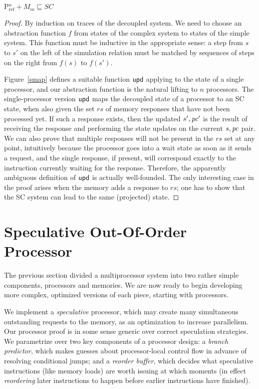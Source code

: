 \begin{theorem}
$\text{P$^n_{\text{ref}}$} + M_m \sqsubseteq SC$\label{scthm}
\end{theorem}
\begin{proof}
\vspace{-.1cm}
By induction on traces of the decoupled system.  We need to choose an
abstraction function $f$ from states of the complex system to states of
the simple system.  This function must be inductive in the
appropriate sense: a step from $s$ to $s'$ on the left of the
simulation relation must be matched by sequences of steps on the right
from $f(s)$ to $f(s')$.

Figure~\ref{smap} defines a suitable function $\mathsf{upd}$ applying to the
state of a single processor, and our abstraction function is the
natural lifting to $n$ processors.
The single-processor version $\mathsf{upd}$ maps
the decoupled state of a processor to an SC state, when also given the
set $rs$ of memory responses that have not been processed yet. If such a
response exists, then the updated $s', \mathit{pc}'$ is the result of
receiving the response and performing the state updates on the current $s,
\mathit{pc}$ pair.  We can also prove that multiple responses will not be present in
the $rs$ set at any point, intuitively because the processor goes into a wait
state as soon as it sends a request, and the single response, if present, will
correspond exactly to the instruction currently waiting for the response.
Therefore, the apparently ambiguous definition of $\mathsf{upd}$ is actually
well-founded.  The only interesting case in the proof arises when the memory adds a
response to $rs$; one has to show that the SC system can lead to the same
(projected) state.
\end{proof}

\section{Speculative Out-Of-Order Processor}\label{sec:ooo}

The previous section divided a multiprocessor system into two rather
simple components, processors and memories.  We are now ready to begin
developing more complex, optimized versions of each piece, starting
with processors.

We implement a \emph{speculative} processor, which may create many
simultaneous outstanding requests to the memory, as an optimization to
increase parallelism.  Our processor proof is in some sense generic
over correct speculation strategies.  We parametrize over two key
components of a processor design: a \emph{branch predictor}, which
makes guesses about processor-local control flow in advance of
resolving conditional jumps; and a
\emph{reorder buffer}, which decides what speculative instructions (like memory loads)
are worth issuing at which moments (in effect \emph{reordering} later
instructions to happen before earlier instructions have finished).

